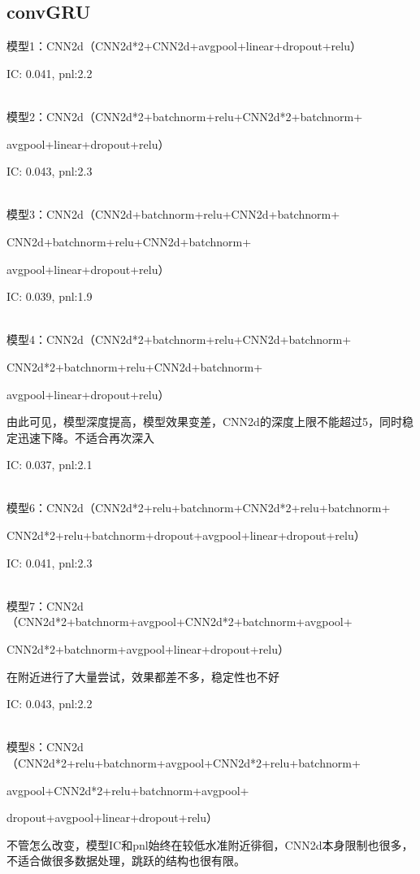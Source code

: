 \documentclass[11pt]{ctexart}
\begin{document}
\subsection{convGRU}
模型1：CNN2d（CNN2d*2+CNN2d+avgpool+linear+dropout+relu）

{\kaishu \small IC: 0.041, pnl:2.2}


~\\
模型2：CNN2d（CNN2d*2+batchnorm+relu+CNN2d*2+batchnorm+

avgpool+linear+dropout+relu）

{\kaishu \small IC: 0.043, pnl:2.3}

~\\
模型3：CNN2d（CNN2d+batchnorm+relu+CNN2d+batchnorm+

CNN2d+batchnorm+relu+CNN2d+batchnorm+

avgpool+linear+dropout+relu）

{\kaishu \small IC: 0.039, pnl:1.9}

~\\
模型4：CNN2d（CNN2d*2+batchnorm+relu+CNN2d+batchnorm+

CNN2d*2+batchnorm+relu+CNN2d+batchnorm+

avgpool+linear+dropout+relu）

由此可见，模型深度提高，模型效果变差，CNN2d的深度上限不能超过5，同时稳定迅速下降。不适合再次深入

{\kaishu \small IC: 0.037, pnl:2.1}

~\\
模型6：CNN2d（CNN2d*2+relu+batchnorm+CNN2d*2+relu+batchnorm+

CNN2d*2+relu+batchnorm+dropout+avgpool+linear+dropout+relu）

{\kaishu \small IC: 0.041, pnl:2.3}

~\\
模型7：CNN2d（CNN2d*2+batchnorm+avgpool+CNN2d*2+batchnorm+avgpool+

CNN2d*2+batchnorm+avgpool+linear+dropout+relu）

在附近进行了大量尝试，效果都差不多，稳定性也不好

{\kaishu \small IC: 0.043, pnl:2.2}

~\\
模型8：CNN2d（CNN2d*2+relu+batchnorm+avgpool+CNN2d*2+relu+batchnorm+

avgpool+CNN2d*2+relu+batchnorm+avgpool+

dropout+avgpool+linear+dropout+relu）

不管怎么改变，模型IC和pnl始终在较低水准附近徘徊，CNN2d本身限制也很多，不适合做很多数据处理，跳跃的结构也很有限。
\end{document}
